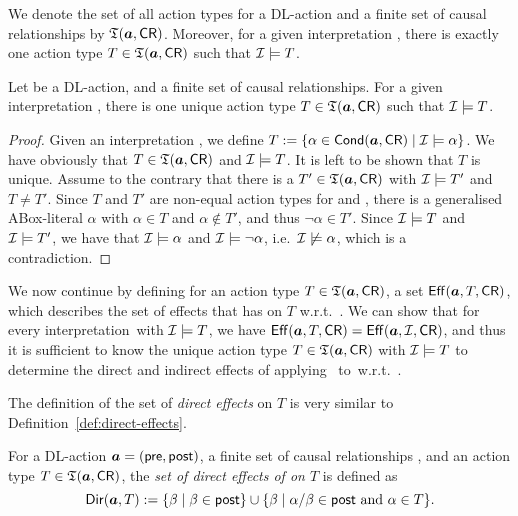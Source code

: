 \noindent
We denote the set of all action types for a DL-action \abf and a finite set of
causal relationships \CR by $\mathfrak{T}(\boldsymbol a,\mathsf{CR})$.
%
Moreover, for a given interpretation \Imc, there is exactly one action type
$T\in\mathfrak{T}(\boldsymbol a,\mathsf{CR})$ such that $\mathcal{I}\models T$.

\begin{lemma}\label{lem:unique-action-type}
    Let \abf be a DL-action, and \CR a finite set of causal relationships.  For
    a given interpretation \Imc, there is one unique action type
    $T\in\mathfrak{T}(\boldsymbol a,\mathsf{CR})$ such that $\mathcal{I}\models T$.
\end{lemma}

\begin{proof}
    Given an interpretation \Imc, we define
    $T:=\{\alpha\in\operatorname{\mathsf{Cond}}(\boldsymbol a,\mathsf{CR})\mid\mathcal{I}\models\alpha\}$.  We have obviously
    that $T\in\mathfrak{T}(\boldsymbol a,\mathsf{CR})$ and $\mathcal{I}\models T$.  It is left to be shown that
    $T$ is unique.  Assume to the contrary that there is a $T'\in\mathfrak{T}(\boldsymbol a,\mathsf{CR})$
    with $\mathcal{I}\models T'$ and $T\ne T'$.  Since $T$ and $T'$ are non-equal
    action types for \abf and \CR, there is a generalised ABox-literal $\alpha$
    with $\alpha\in T$ and $\alpha\notin T'$, and thus $\lnot\alpha\in T'$.
    Since $\mathcal{I}\models T$ and $\mathcal{I}\models T'$, we have that $\mathcal{I}\models\alpha$
    and $\mathcal{I}\models\lnot\alpha$, i.e.~$\mathcal{I}\not\models\alpha$, which is a
    contradiction.
\end{proof}

\noindent
We now continue by defining for an action type $T\in\mathfrak{T}(\boldsymbol a,\mathsf{CR})$, a set
$\operatorname{\mathsf{Eff}}(\boldsymbol a,T,\mathsf{CR})$, which describes the set of effects that \abf has on $T$
w.r.t.~\CR.  We can show that for every interpretation~\Imc with
$\mathcal{I}\models T$, we have $\operatorname{\mathsf{Eff}}(\boldsymbol a,T,\mathsf{CR})=\operatorname{\mathsf{Eff}}(\boldsymbol a,\mathcal{I},\mathsf{CR})$, and thus it is
sufficient to know the unique action type $T\in\mathfrak{T}(\boldsymbol a,\mathsf{CR})$ with
$\mathcal{I}\models T$ to determine the direct and indirect effects of applying~\abf
to~\Imc w.r.t.~\CR.

The definition of the set of \emph{direct effects} on $T$ is very similar to
Definition~\ref{def:direct-effects}.

\begin{definition}\label{def:direct-effects-type}
    For a DL-action $\boldsymbol a=(\mathsf{pre},\mathsf{post})$, a finite set of causal
    relationships \CR, and an action type $T\in\mathfrak{T}(\boldsymbol a,\mathsf{CR})$,
    the \emph{set of direct effects of \abf on $T$} is defined as
    \[\Dir(\abf,T):=\{\beta\mid\beta\in\post\}\cup%
        \{\beta\mid\alpha/\beta\in\post\text{ and }\alpha\in T\}.\]
\end{definition}

